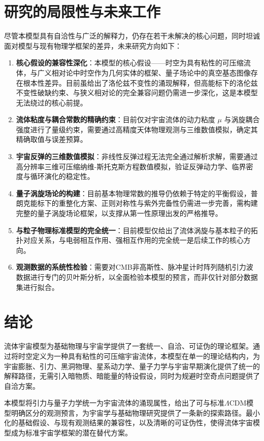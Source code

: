 \documentclass[aps,prd,preprint,superscriptaddress,floatfix,numbers,sort&compress]{revtex4-2}
\begin{document}
\section{研究的局限性与未来工作}
尽管本模型具有自洽性与广泛的解释力，仍存在若干未解决的核心问题，同时坦诚面对模型与现有物理学框架的差异，未来研究方向如下：
\begin{enumerate}
    \item \textbf{核心假设的兼容性深化}：本模型的核心假设——时空为具有粘性的可压缩流体，与广义相对论中时空作为几何实体的框架、量子场论中的真空基态图像存在根本性差异。目前虽给出了洛伦兹不变性的涌现解释，但高能标下的洛伦兹不变性破缺约束、与狭义相对论的完全兼容问题仍需进一步深化，这是本模型无法绕过的核心前提。
    \item \textbf{流体粘度与耦合常数的精确约束}：目前仅对宇宙流体的动力粘度 $\mu$ 与涡旋耦合强度进行了量级约束，需要通过高精度天体物理观测与三维数值模拟，确定其精确取值与误差预算。
    \item \textbf{宇宙反弹的三维数值模拟}：非线性反弹过程无法完全通过解析求解，需要通过高分辨率三维可压缩纳维-斯托克斯方程数值模拟，验证反弹动力学、临界密度与循环演化的稳定性。
    \item \textbf{量子涡旋场论的构建}：目前基本物理常数的推导仍依赖于特定的平衡假设，普朗克能标下的重整化方案、正则对称性与紫外完备性仍需进一步完善，需构建完整的量子涡旋场论框架，以支撑从第一性原理出发的严格推导。
    \item \textbf{与粒子物理标准模型的完全统一}：目前模型仅给出了流体涡旋与基本粒子的拓扑对应关系，与电弱相互作用、强相互作用的完全统一是后续工作的核心方向。
    \item \textbf{观测数据的系统性检验}：需要对CMB非高斯性、脉冲星计时阵列随机引力波数据进行专门的贝叶斯分析，以全面检验本模型的预言，而非仅针对部分数据集进行拟合。
\end{enumerate}

\section{结论}
流体宇宙模型为基础物理与宇宙学提供了一套统一、自洽、可证伪的理论框架。通过将时空定义为一种具有粘性的可压缩宇宙流体，本模型在单一的理论结构内，为宇宙膨胀、引力、黑洞物理、星系动力学、量子力学与宇宙早期演化提供了统一的解释路径，无需引入暗物质、暗能量的特设假设，同时为规避时空奇点问题提供了自洽方案。

本模型将引力与量子力学统一为宇宙流体的涌现属性，给出了可与标准$\Lambda$CDM模型明确区分的观测预言，为宇宙学与基础物理研究提供了一条新的探索路径。最小化的基础假设、与现有观测结果的兼容性，以及清晰的可证伪性，使得流体宇宙模型成为标准宇宙学框架的潜在替代方案。
\end{document}
